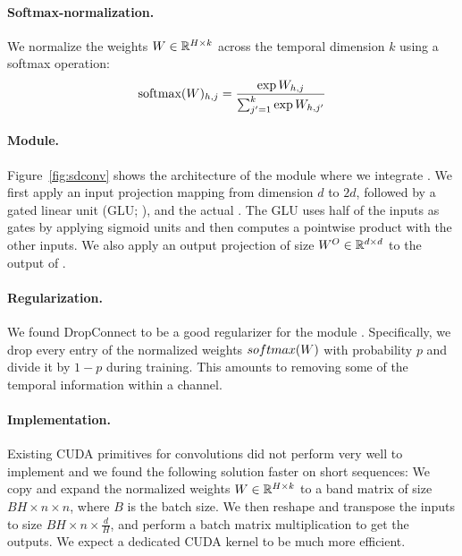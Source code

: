 \paragraph{Softmax-normalization.}
We normalize the weights ${W} \in \mathbb{R}^{H \times k}$ across the temporal dimension $k$ using a softmax operation:
\[
\text{softmax}({W})_{h,j} = \frac{\exp{{W}_{h, j}}}{\sum_{j'=1}^k \exp{{W}_{h, j'}}}
\]

\paragraph{Module.} Figure~\ref{fig:sdconv} shows the architecture of the module where we integrate \sdconv{}. 
We first apply an input projection mapping from dimension $d$ to $2d$, followed by a gated linear unit (GLU;  \citealt{dauphin2017convlm}), and the actual \sdconvfull{}.
The GLU uses half of the inputs as gates by applying sigmoid units and then computes a pointwise product with the other inputs.
We also apply an output projection of size ${W}^O \in \mathbb{R}^{d \times d}$ to the output of \sdconv{}.

\paragraph{Regularization. }
We found DropConnect to be a good regularizer for the \sdconv{} module \citep{wan2013regularization}.
Specifically, we drop every entry of the normalized weights $softmax({W})$ with probability $p$ and divide it by $1-p$ during training. 
This amounts to removing some of the temporal information within a channel.

\paragraph{Implementation.}
Existing CUDA primitives for convolutions did not perform very well to implement \sdconv{} and we found the following solution faster on short sequences:
We copy and expand the normalized weights ${W} \in \mathbb{R}^{H \times k}$ to a band matrix of size $BH \times n \times n$, where $B$ is the batch size.
We then reshape and transpose the inputs to size $BH \times n \times \frac{d}{H}$, and perform a batch matrix multiplication to get the outputs.
We expect a dedicated CUDA kernel to be much more efficient.
